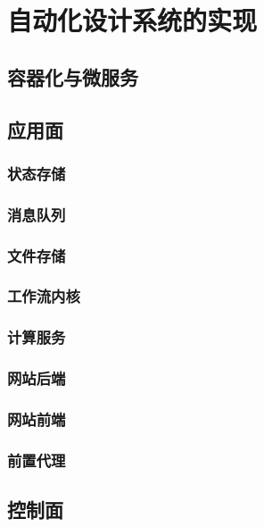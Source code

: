 \documentclass[index]{subfiles}
\begin{document}
\chapter{自动化设计系统的实现}
\section{容器化与微服务}
\section{应用面}
\subsection{状态存储}
\subsection{消息队列}
\subsection{文件存储}
\subsection{工作流内核}
\subsection{计算服务}
\subsection{网站后端}
\subsection{网站前端}
\subsection{前置代理}
\section{控制面}
\end{document}
